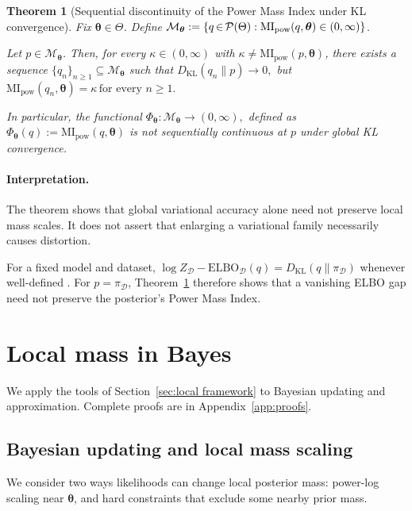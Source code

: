 \documentclass[11pt,a4paper]{article}
\newcommand{\MI}{\mathrm{MI}}
\newcommand{\pa}{\boldsymbol\theta}
\theoremstyle{compactplain}
\newtheorem{theorem}{Theorem}[section]
\theoremstyle{compactdefinition}
\numberwithin{equation}{section}
\begin{document}
\begin{theorem}[Sequential discontinuity of the Power Mass Index under KL convergence]
\label{thm:kl-mi-discontinuous}
Fix \(\pa\in\Theta\). Define
\(\mathcal M_{\pa}:= \{q\mkern-2mu\in\mkern-2mu\mathcal P(\Theta): \MI_{\mathrm{pow}}(q,\pa)\in(0,\infty)\}\).

Let \(p\in\mathcal M_{\pa}\). Then, for every
\(\kappa\in(0,\infty)\) with \(\kappa\neq \MI_{\mathrm{pow}}(p,\pa)\), there exists a sequence
\(\{q_n\}_{n\ge1}\subseteq \mathcal M_{\pa}\) such that
$
D_{\mathrm{KL}}(q_n\|p)\to0,
$
but
$
\MI_{\mathrm{pow}}(q_n,\pa)=\kappa
\,\allowbreak
\text{for every } n\ge1.
$

In particular, the functional
$
\Phi_{\pa}:\mathcal M_{\pa}\to(0,\infty),$ defined as 
$
\Phi_{\pa}(q):=\MI_{\mathrm{pow}}(q,\pa)
$
is not sequentially continuous at \(p\) under global KL convergence.
\end{theorem}

\paragraph{Interpretation.}
The theorem shows that global variational accuracy alone need not preserve local mass scales. It does not assert that enlarging a variational family necessarily causes distortion.

For a fixed model and dataset,
\(\log Z_{\mathcal D}-\mathrm{ELBO}_{\mathcal D}(q)=D_{\mathrm{KL}}(q\|\pi_{\mathcal D})\)
whenever well-defined \cite{blei2017variational}. For \(p=\pi_{\mathcal D}\), Theorem~\ref{thm:kl-mi-discontinuous} therefore shows that a vanishing ELBO gap need not preserve the posterior's Power Mass Index.

\section{Local mass in Bayes}%
\label{sec:theory}

We apply the tools of Section~\ref{sec:local framework} to Bayesian updating and approximation. Complete proofs are in Appendix~\ref{app:proofs}.

\subsection{Bayesian updating and local mass scaling}

We consider two ways likelihoods can change local posterior mass: power-log scaling near \(\pa\), and hard constraints that exclude some nearby prior mass.
\end{document}
